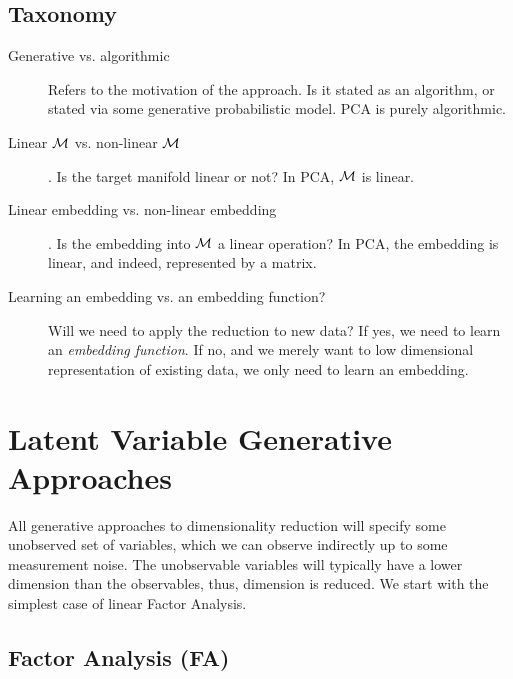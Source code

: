 \documentclass[12pt,a4paper]{article}
\begin{document}
\subsection{Taxonomy}
\begin{description}
	\item [Generative vs. algorithmic] Refers to the motivation of the approach. Is it stated as an algorithm, or stated via some generative probabilistic model. 
	PCA is purely algorithmic. 

	\item [Linear $\mathcal{M}$ vs. non-linear $\mathcal{M}$]. 
	Is the target manifold linear or not?
	In PCA, $\mathcal{M}$ is linear.

	\item [Linear embedding vs. non-linear embedding]. 
	Is the embedding into $\mathcal{M}$ a linear operation?
	In PCA, the embedding is linear, and indeed, represented by a matrix. 
	
	\item [Learning an embedding vs. an embedding function?]
	Will we need to apply the reduction to new data? 
	If yes, we need to learn an \emph{embedding function}. 
	If no, and we merely want to low dimensional representation of existing data, we only need to learn an embedding. 
	
\end{description}





\section{Latent Variable Generative Approaches}
All generative approaches to dimensionality reduction will specify some unobserved set of variables, which we can observe indirectly up to some measurement noise. 
The unobservable variables will typically have a lower dimension than the observables, thus, dimension is reduced. 
We start with the simplest case of linear Factor Analysis. 


\subsection{Factor Analysis (FA)}
\end{document}
